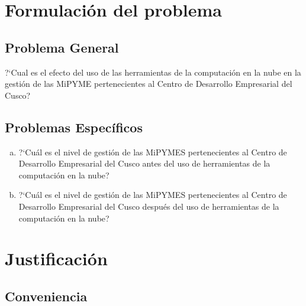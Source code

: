 \section{Formulación del problema}
\subsection{Problema General}
?`Cual es el efecto del uso de las herramientas de la computación en la nube
en la gestión de las MiPYME pertenecientes al Centro de Desarrollo Empresarial
del Cusco?
\subsection{Problemas Específicos}
\begin{enumerate}[a.]
\item ?`Cuál es el nivel de gestión de las MiPYMES pertenecientes al Centro
de Desarrollo Empresarial del Cusco antes del uso de herramientas de la computación
en la nube?
\item ?`Cuál es el nivel de gestión de las MiPYMES pertenecientes al Centro
de Desarrollo Empresarial del Cusco después del uso de herramientas de la computación
en la nube?
\end{enumerate}

%
\section{Justificación}
\subsection{Conveniencia}

